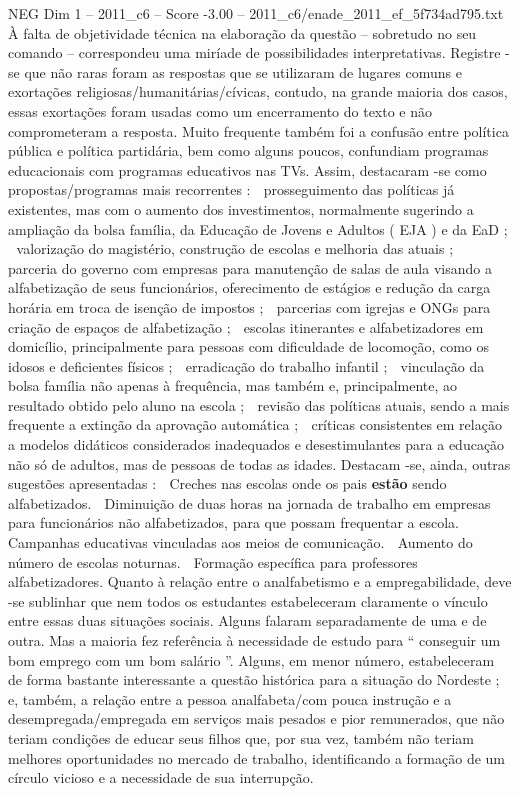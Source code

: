 \begin{textsample}{NEG Dim 1 – 2011\_c6 – Score -3.00 – 2011\_c6/enade\_2011\_ef\_5f734ad795.txt}
À falta de objetividade técnica na elaboração da questão – sobretudo no seu comando – correspondeu uma miríade de possibilidades interpretativas.
Registre -se que não raras foram as respostas que se utilizaram de lugares comuns e exortações religiosas/humanitárias/cívicas, contudo, na grande maioria dos casos, essas exortações foram usadas como um encerramento do texto e não comprometeram a resposta.
Muito frequente também foi a confusão entre política pública e política partidária, bem como alguns poucos, confundiam programas educacionais com programas educativos nas TVs.
Assim, destacaram -se como propostas/programas mais recorrentes :  prosseguimento das políticas já existentes, mas com o aumento dos investimentos, normalmente sugerindo a ampliação da bolsa família, da Educação de Jovens e Adultos ( EJA ) e da EaD ;  valorização do magistério, construção de escolas e melhoria das atuais ;  parceria do governo com empresas para manutenção de salas de aula visando a alfabetização de seus funcionários, oferecimento de estágios e redução da carga horária em troca de isenção de impostos ;  parcerias com igrejas e ONGs para criação de espaços de alfabetização ;  escolas itinerantes e alfabetizadores em domicílio, principalmente para pessoas com dificuldade de locomoção, como os idosos e deficientes físicos ;  erradicação do trabalho infantil ;  vinculação da bolsa família não apenas à frequência, mas também e, principalmente, ao resultado obtido pelo aluno na escola ;  revisão das políticas atuais, sendo a mais frequente a extinção da aprovação automática ;  críticas consistentes em relação a modelos didáticos considerados inadequados e desestimulantes para a educação não só de adultos, mas de pessoas de todas as idades.
Destacam -se, ainda, outras sugestões apresentadas :  Creches nas escolas onde os pais \textbf{estão} sendo alfabetizados.  Diminuição de duas horas na jornada de trabalho em empresas para funcionários não alfabetizados, para que possam frequentar a escola.  Campanhas educativas vinculadas aos meios de comunicação.  Aumento do número de escolas noturnas.  Formação específica para professores alfabetizadores.
Quanto à relação entre o analfabetismo e a empregabilidade, deve -se sublinhar que nem todos os estudantes estabeleceram claramente o vínculo entre essas duas situações sociais.
Alguns falaram separadamente de uma e de outra.
Mas a maioria fez referência à necessidade de estudo para “ conseguir um bom emprego com um bom salário ”.
Alguns, em menor número, estabeleceram de forma bastante interessante a questão histórica para a situação do Nordeste ; e, também, a relação entre a pessoa analfabeta/com pouca instrução e a desempregada/empregada em serviços mais pesados e pior remunerados, que não teriam condições de educar seus filhos que, por sua vez, também não teriam melhores oportunidades no mercado de trabalho, identificando a formação de um círculo vicioso e a necessidade de sua interrupção.

\end{textsample}
